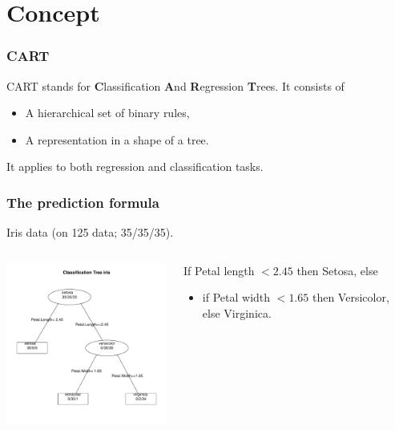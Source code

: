 \section{Concept}
\begin{frame}
\frametitle{CART}
CART stands for {\bf C}lassification {\bf A}nd {\bf R}egression {\bf T}rees. It consists of 
\begin{itemize}
\item A hierarchical set of binary rules,
\item A representation in a shape of a tree.
\end{itemize}
It applies to both regression and classification tasks.
\end{frame}
\begin{frame}
\frametitle{The prediction formula}
Iris data (on 125 data; 35/35/35).
\begin{columns}
\begin{column}{0.5\textwidth}
\begin{center}
\includegraphics[width=6.5cm]{../../Graphs/IRIS_CART.pdf}
\end{center}
\end{column}
\begin{column}{0.5\textwidth}
\small
If Petal length $< 2.45$ then Setosa, else
\begin{itemize}
\item if Petal width $< 1.65$ then Versicolor, else Virginica.
\end{itemize}
\end{column}
\end{columns}
\end{frame}
